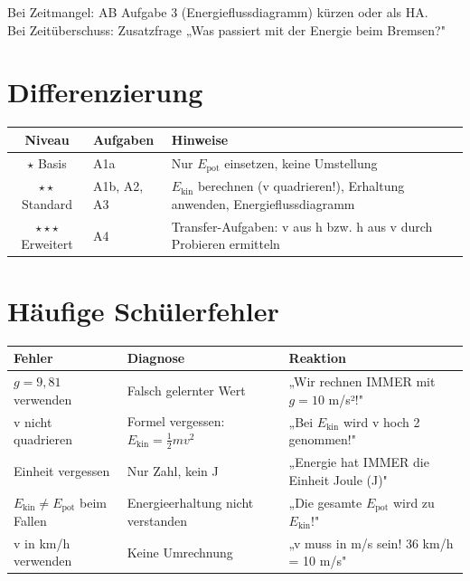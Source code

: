 \documentclass[11pt, a4paper]{article}
\begin{document}
\begin{warnbox}[Zeitpuffer]
Bei Zeitmangel: AB Aufgabe 3 (Energieflussdiagramm) kürzen oder als HA.\\
Bei Zeitüberschuss: Zusatzfrage „Was passiert mit der Energie beim Bremsen?"
\end{warnbox}


\section*{Differenzierung}

\begin{tabularx}{\textwidth}{@{}c|l|X@{}}
\toprule
\textbf{Niveau} & \textbf{Aufgaben} & \textbf{Hinweise} \\
\midrule
$\star$ Basis & A1a & Nur $E_\text{pot}$ einsetzen, keine Umstellung \\
$\star\star$ Standard & A1b, A2, A3 & $E_\text{kin}$ berechnen (v quadrieren!), Erhaltung anwenden, Energieflussdiagramm \\
$\star\star\star$ Erweitert & A4 & Transfer-Aufgaben: v aus h bzw. h aus v durch Probieren ermitteln \\
\bottomrule
\end{tabularx}


\section*{Häufige Schülerfehler}

\begin{tabularx}{\textwidth}{@{}l|X|X@{}}
\toprule
\textbf{Fehler} & \textbf{Diagnose} & \textbf{Reaktion} \\
\midrule
$g = 9{,}81$ verwenden & Falsch gelernter Wert & „Wir rechnen IMMER mit $g = 10$ m/s²!" \\
\midrule
v nicht quadrieren & Formel vergessen: $E_\text{kin} = \frac{1}{2} m v^2$ & „Bei $E_\text{kin}$ wird v hoch 2 genommen!" \\
\midrule
Einheit vergessen & Nur Zahl, kein J & „Energie hat IMMER die Einheit Joule (J)" \\
\midrule
$E_\text{kin} \neq E_\text{pot}$ beim Fallen & Energieerhaltung nicht verstanden & „Die gesamte $E_\text{pot}$ wird zu $E_\text{kin}$!" \\
\midrule
v in km/h verwenden & Keine Umrechnung & „v muss in m/s sein! 36 km/h = 10 m/s" \\
\bottomrule
\end{tabularx}
\end{document}
